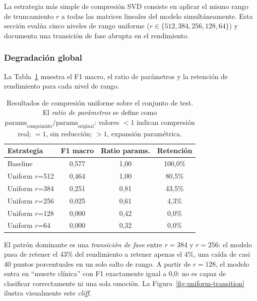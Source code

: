 La estrategia más simple de compresión SVD consiste en aplicar el mismo rango de
truncamiento $r$ a todas las matrices lineales del modelo simultáneamente. Esta sección
evalúa cinco niveles de rango uniforme ($r \in \{512, 384, 256, 128, 64\}$) y documenta
una transición de fase abrupta en el rendimiento.

\subsubsection{Degradación global}

La Tabla~\ref{tab:uniform} muestra el F1 macro, el ratio de parámetros y
la retención de rendimiento para cada nivel de rango.

\begin{table}[H]
    \centering
    \caption{Resultados de compresión uniforme sobre el conjunto de test.
    El \emph{ratio de parámetros} se define como
    $\text{params}_{\text{comprimido}}/\text{params}_{\text{original}}$:
    valores $<1$ indican compresión real; $=1$, sin reducción; $>1$,
    expansión paramétrica.}
    \label{tab:uniform}
    \small
    \begin{tabular}{@{}lccc@{}}
        \toprule
        \textbf{Estrategia} & \textbf{F1 macro} & \textbf{Ratio params.} & \textbf{Retención} \\
        \midrule
        Baseline           & 0{,}577 & 1{,}00 & 100{,}0\% \\
        Uniform $r$=512    & 0{,}464 & 1{,}00 & 80{,}5\%  \\
        Uniform $r$=384    & 0{,}251 & 0{,}81 & 43{,}5\%  \\
        Uniform $r$=256    & 0{,}025 & 0{,}61 & 4{,}3\%   \\
        Uniform $r$=128    & 0{,}000 & 0{,}42 & 0{,}0\%   \\
        Uniform $r$=64     & 0{,}000 & 0{,}32 & 0{,}0\%   \\
        \bottomrule
    \end{tabular}
\end{table}

El patrón dominante es una \emph{transición de fase} entre $r=384$ y $r=256$: el modelo
pasa de retener el 43\% del rendimiento a retener apenas el 4\%, una caída de casi 40
puntos porcentuales en un solo salto de rango. A partir de $r=128$, el modelo entra en
``muerte clínica'' con F1 exactamente igual a 0{,}0: no es capaz de clasificar
correctamente ni una sola emoción. La Figura~\ref{fig:uniform-transition} ilustra
visualmente este \emph{cliff}.

